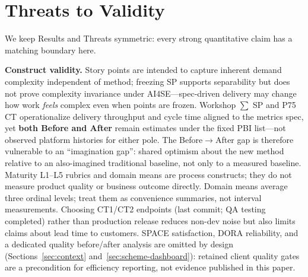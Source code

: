\documentclass[10pt,conference]{IEEEtran}
\begin{document}
\section{Threats to Validity}
\label{sec:threats}

We keep Results and Threats symmetric: every strong quantitative claim has a matching boundary here.

\textbf{Construct validity.}
Story points are intended to capture inherent demand complexity independent of method; freezing SP supports separability but does not prove complexity invariance under AI4SE---spec-driven delivery may change how work \emph{feels} complex even when points are frozen.
Workshop $\sum$ SP and P75 CT operationalize delivery throughput and cycle time aligned to the metrics spec, yet \textbf{both Before and After} remain estimates under the fixed PBI list---not observed platform histories for either pole.
The Before$\rightarrow$After gap is therefore vulnerable to an ``imagination gap'': shared optimism about the new method relative to an also-imagined traditional baseline, not only to a measured baseline.
Maturity L1--L5 rubrics and domain means are process constructs; they do not measure product quality or business outcome directly.
Domain means average three ordinal levels; treat them as convenience summaries, not interval measurements.
Choosing CT1/CT2 endpoints (last commit; QA testing completed) rather than production release reduces non-dev noise but also limits claims about lead time to customers.
SPACE satisfaction, DORA reliability, and a dedicated quality before/after analysis are omitted by design (Sections~\ref{sec:context} and~\ref{sec:scheme-dashboard}): retained client quality gates are a precondition for efficiency reporting, not evidence published in this paper.
\end{document}
